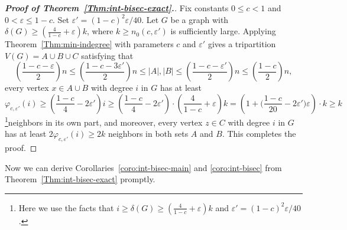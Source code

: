 \documentclass{aic}
\begin{document}
	
	\begin{proof}[\bf Proof of Theorem~\ref{Thm:int-bisec-exact}.]
		Fix constants $0\leq c<1$ and $0<\varepsilon\leq 1-c.$
		Set $\varepsilon'=(1-c)^2\varepsilon/40$.
		Let $G$ be a graph with $\delta(G) \geq \left(\frac{4}{1-c}+\varepsilon\right)k$, where $k \geq n_0(c,\varepsilon')$ is sufficiently large.
		Applying Theorem~\ref{Thm:min-indegree} with parameters $c$ and $\varepsilon'$ gives a tripartition $V(G) = A \cup B \cup C$ satisfying that
		$$\left(\frac{1-c-\varepsilon}{2}\right)n\leq \left(\frac{1-c-3\varepsilon'}{2}\right)n\leq |A|,|B|\leq \left(\frac{1-c-\varepsilon'}{2}\right)n\leq \left(\frac{1-c}{2}\right)n,$$
		every vertex $x\in A\cup B$ with degree $i$ in $G$ has at least
		$$\varphi_{c,\varepsilon'}(i)\geq \left(\frac{1-c}{4}-2\varepsilon'\right)i\geq \left(\frac{1-c}{4}-2\varepsilon'\right)\cdot \left(\frac{4}{1-c}+\varepsilon\right)k=\left(1+\bigg(\frac{1-c}{20}-2\varepsilon'\bigg)\varepsilon\right)\cdot k\geq k$$\footnote{Here we use the facts that $i\geq \delta(G)\geq \left(\frac{4}{1-c}+\varepsilon\right)k$ and $\varepsilon'=(1-c)^2\varepsilon/40$.}neighbors in its own part,
		and moreover, every vertex $z\in C$ with degree $i$ in $G$ has at least $2\varphi_{c,\varepsilon'}(i)\geq 2k$ neighbors in both sets $A$ and $B$.
		This completes the proof.
	\end{proof}
	
	
	Now we can derive Corollaries~\ref{coro:int-bisec-main} and \ref{coro:int-bisec} from Theorem~\ref{Thm:int-bisec-exact} promptly.
	
\end{document}
